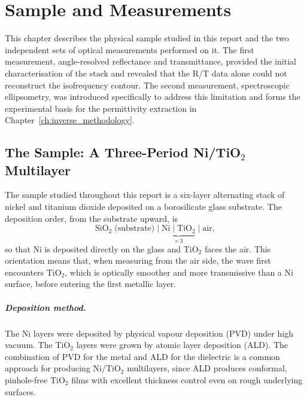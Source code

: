 
\chapter{Sample and Measurements}
\label{ch:sample_measurements}

This chapter describes the physical sample studied in this report and the two
independent sets of optical measurements performed on it. The first measurement,
angle-resolved reflectance and transmittance, provided the initial characterisation
of the stack and revealed that the R/T data alone could not reconstruct the
isofrequency contour. The second measurement, spectroscopic ellipsometry, was
introduced specifically to address this limitation and forms the experimental
basis for the permittivity extraction in Chapter~\ref{ch:inverse_methodology}.

\section{The Sample: A Three-Period Ni/TiO\texorpdfstring{$_2$}{2} Multilayer}

The sample studied throughout this report is a six-layer alternating stack of
nickel and titanium dioxide deposited on a borosilicate glass substrate. The
deposition order, from the substrate upward, is
\begin{equation}
  \text{SiO}_2\;\text{(substrate)} \;\Big|\;
  \underbrace{\text{Ni} \;\Big|\; \text{TiO}_2}_{\times\,3} \;\Big|\;
  \text{air},
\end{equation}
so that Ni is deposited directly on the glass and TiO$_2$ faces the air. This
orientation means that, when measuring from the air side, the wave first
encounters TiO$_2$, which is optically smoother and more transmissive than a
Ni surface, before entering the first metallic layer.

\paragraph{Deposition method.}
The Ni layers were deposited by physical vapour deposition (PVD) under high
vacuum. The TiO$_2$ layers were grown by atomic layer deposition (ALD). The
combination of PVD for the metal and ALD for the dielectric is a common
approach for producing Ni/TiO$_2$ multilayers, since ALD produces conformal,
pinhole-free TiO$_2$ films with excellent thickness control even on rough
underlying surfaces.

